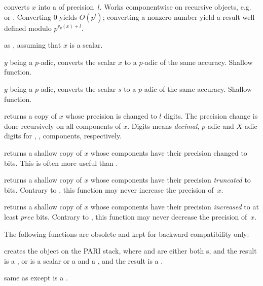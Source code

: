  converts $x$ into a 
of precision~$l$. Works componentwise on recursive objects,
e.g.~ or . Converting $0$ yields $O(p^l)$; converting a
nonzero number yield a result well defined modulo $p^{v_p(x) + l}$.

 as , assuming that $x$
is a scalar.

 $y$ being a $p$-adic, converts the scalar $x$
to a $p$-adic of the same accuracy. Shallow function.

 $y$ being a $p$-adic, converts the scalar $s$
to a $p$-adic of the same accuracy. Shallow function.

 returns a copy of $x$ whose precision is
changed to $l$ digits. The precision change is done recursively on all
components of $x$. Digits means \emph{decimal}, $p$-adic and $X$-adic digits
for , ,  components, respectively.

 returns a shallow copy of $x$ whose
 components have their precision changed to  bits.
This is often more useful than .

 returns a shallow copy of $x$ whose
 components have their precision \emph{truncated} to 
bits. Contrary to , this function may never increase
the precision of~$x$.

 returns a shallow copy of $x$ whose
 components have their precision \emph{increased} to at least $prec$
bits. Contrary to , this function may never decrease
the precision of~$x$.

The following functions are obsolete and kept for backward compatibility only:




 creates the object  on
the PARI stack, where  and  are either both s, and the
result is a , or  is a scalar or a  and  a
, and the result is a .

 same as  except  is a
.

